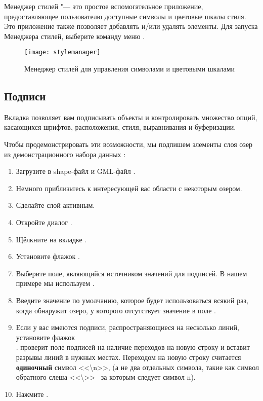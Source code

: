 Менеджер стилей "--- это простое вспомогательное приложение, предоставляющее
пользователю доступные символы и цветовые шкалы стиля. Это приложение также
позволяет добавлять и/или удалять элементы. Для запуска Менеджера стилей,
выберите команду меню  \arrow {}.

\begin{figure}[ht]
   \centering
   \texttt{[image: stylemanager]}
   \caption{Менеджер стилей для управления символами и цветовыми шкалами \wincaption}\label{fig:stylemanager}
\end{figure}

\subsection{Подписи}\label{labeltab}

Вкладка  позволяет вам подписывать объекты и контролировать
множество опций, касающихся шрифтов, расположения, стиля, выравнивания и
буферизации.

Чтобы продемонстрировать эти возможности, мы подпишем элементы слоя озер
из демонстрационного набора данных \qg:

\begin{enumerate}
\item Загрузите в \qg shape-файл  и GML-файл .
\item Немного приблизьтесь к интересующей вас области с некоторым озером.
\item Сделайте слой  активным.
\item Откройте диалог .
\item Щёлкните на вкладке .
\item Установите флажок .
\item Выберите поле, являющийся источником значений для подписей. В нашем
примере мы используем .
\item Введите значение по умолчанию, которое будет использоваться всякий
раз, когда \qg обнаружит озеро, у которого отсутствует значение в поле
.
\item Если у вас имеются подписи, распространяющиеся на несколько линий,
установите флажок \\
. \qg проверит поле подписей на
наличие переходов на новую строку и вставит разрывы линий в нужных местах.
Переходом на новую строку считается \textbf{одиночный} символ <<\textbackslash n>>,
(а не два отдельных символа, такие как символ обратного слеша <<\textbackslash >>
~за которым следует символ n).
\item Нажмите .
\end{enumerate}

